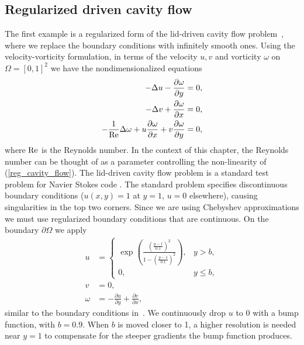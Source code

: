 \subsection{Regularized driven cavity flow}
\label{sec:cavity}
The first example is a regularized form of the lid-driven cavity flow problem~\cite{hirsch2007numerical}, where we replace the boundary conditions with infinitely smooth ones. Using the velocity-vorticity formulation, in terms of the velocity $u,v$ and vorticity $\omega$ on $\Omega = [0,1]^2$ we have the nondimensionalized equations
\begin{equation}
  \begin{aligned}
    -\Delta u - \frac{\partial \omega}{\partial y} &=0, \\
    -\Delta v + \frac{\partial \omega}{\partial x} &=0, \\
    -\frac{1}{\text{Re}} \Delta \omega + u \frac{\partial \omega}{\partial x} + v \frac{\partial \omega}{\partial y} &=0,
  \end{aligned}
  \label{reg_cavity_flow}
\end{equation}
where $\text{Re}$ is the Reynolds number. In the context of this chapter, the Reynolds number can be thought of as a parameter controlling the non-linearity of (\ref{reg_cavity_flow}). The lid-driven cavity flow problem is a standard test problem for Navier Stokes code \cite{botella1998benchmark}. The standard problem specifies discontinuous boundary conditions ($u(x,y)=1$ at $y=1$, $u=0$ elsewhere), causing singularities in the top two corners. Since we are using Chebyshev approximations we must use regularized boundary conditions that are continuous. On the boundary $\partial \Omega$ we apply
\begin{equation}
  \begin{aligned}
    u &= \begin{cases}
      \exp \left(\frac{\left(\frac{y-1}{0.1}\right)^2}{1-\left(\frac{y-1}{0.1}\right)^2}\right), & y>b, \\
      0, & y \leq b,
    \end{cases} \\
    v &= 0, \\
    \omega &= - \frac{\partial u}{\partial y} + \frac{\partial v}{\partial x},
  \end{aligned}
  \label{cavityflow_initalguess}
\end{equation}
similar to the boundary conditions in~\cite{shen1990numerical}. We continuously drop $u$ to 0 with a bump function, with $b=0.9$. When $b$ is moved closer to 1, a higher resolution is needed near $y=1$ to compensate for the steeper gradients the bump function produces.

